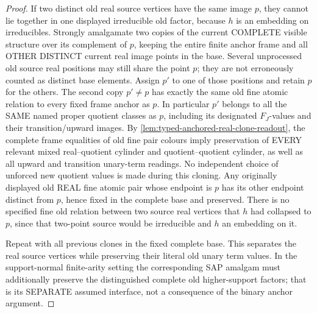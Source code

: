 \begin{proof}
If two distinct old real source
vertices have the same image \(p\),
they cannot lie together in one
displayed irreducible old factor,
because \(h\) is an embedding on
irreducibles. Strongly amalgamate
two copies of the current COMPLETE
visible structure over its
complement of \(p\), keeping
the entire finite anchor frame
and all OTHER DISTINCT current
real image points in the base.
Several unprocessed old source
real positions may still share
the point \(p\); they are not
erroneously counted as distinct
base elements. Assign \(p'\)
to one of those positions
and retain \(p\) for the others.
The second copy \(p'\ne p\)
has exactly the same old fine
atomic relation to every fixed
frame anchor as \(p\). In
particular \(p'\) belongs to
all the SAME named proper
quotient classes as \(p\),
including its designated
\(F_J\)-values and their
transition/upward images.
By
\cref{lem:typed-anchored-real-clone-readout},
the complete frame equalities of
old fine pair colours imply
preservation of EVERY relevant
mixed real--quotient cylinder
and quotient--quotient cylinder,
as well as all upward and
transition unary-term readings.
No independent choice of
unforced new quotient values
is made during this cloning. Any originally
displayed old REAL fine atomic
pair whose endpoint is \(p\)
has its other endpoint distinct
from \(p\), hence fixed in the
complete base and preserved.
There is no specified fine old
relation between two source
real vertices that \(h\) had
collapsed to \(p\), since that
two-point source would be
irreducible and \(h\) an
embedding on it.

Repeat with all previous clones
in the fixed complete base.
This separates the real source
vertices while preserving their
literal old unary term values.
In the support-normal
finite-arity setting the
corresponding SAP amalgam must
additionally preserve the
distinguished complete old
higher-support factors;
that is its SEPARATE assumed
interface, not a consequence
of the binary anchor argument.


\end{proof}
